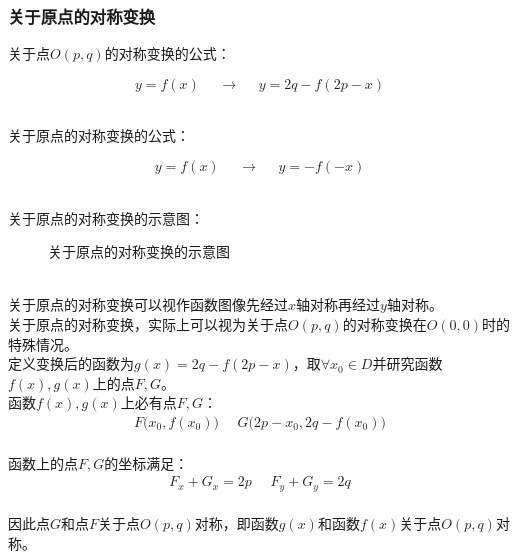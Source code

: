\documentclass[UTF8]{ctexart}
\begin{document}
\newpage

\subsubsection{关于原点的对称变换}
    \setcounter{equation}{0}
    关于点$O(p,q)$的对称变换的公式：
    \begin{large}
        \begin{equation*}
            y=f(x)~~~~~~\longrightarrow~~~~~~y=2q-f(2p-x)
        \end{equation*}
    \end{large}\\
    关于原点的对称变换的公式：
    \begin{large}
        \begin{equation*}
            y=f(x)~~~~~~\longrightarrow~~~~~~y=-f(-x)
        \end{equation*}
    \end{large}\\
    关于原点的对称变换的示意图：
    \begin{figure}[h]
        \begin{center}
            \caption{关于原点的对称变换的示意图}
        \end{center}
    \end{figure}\\
    关于原点的对称变换可以视作函数图像先经过$x$轴对称再经过$y$轴对称。\\[3mm]
    关于原点的对称变换，实际上可以视为关于点$O(p,q)$的对称变换在$O(0,0)$时的特殊情况。\\[6mm]
    定义变换后的函数为$g(x)=2q-f(2p-x)$，取$\forall x_0\in D$并研究函数$f(x),g(x)$上的点$F,G$。\\[3mm]
    函数$f(x),g(x)$上必有点$F,G$：
    \begin{align}
        F\big(x_0,f(x_0)\big)~~~~~~G\big(2p-x_0,2q-f(x_0)\big)
    \end{align}\\
    函数上的点$F,G$的坐标满足：
    \begin{align}
        F_x+G_x=2p~~~~~~F_y+G_y=2q
    \end{align}\\
    因此点$G$和点$F$关于点$O(p,q)$对称，即函数$g(x)$和函数$f(x)$关于点$O(p,q)$对称。
\end{document}
